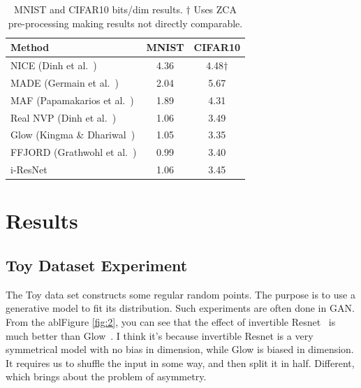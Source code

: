 \documentclass[final]{cvpr}
\begin{document}
\begin{table}[]
   \caption{MNIST and CIFAR10 bits/dim results. $†$ Uses ZCA pre-processing making results not directly comparable.}
   \label{table2}
   \begin{center}
      \begin{tabular}{@{}lcc@{}}
         \toprule
         Method                          & MNIST & CIFAR10 \\ \midrule
         NICE (Dinh et al.~\cite{dinh2014nice})        & 4.36  & 4.48$†$ \\
         MADE (Germain et al.~\cite{germain2015made})     & 2.04  & 5.67    \\
         MAF (Papamakarios et al.~\cite{papamakarios2017masked}) & 1.89  & 4.31    \\
         Real NVP (Dinh et al.~\cite{dinh2016density})    & 1.06  & 3.49    \\
         Glow (Kingma \& Dhariwal~\cite{kingma2018glow}) & 1.05  & 3.35    \\
         FFJORD (Grathwohl et al.~\cite{grathwohl2019scalable}) & 0.99  & 3.40    \\ \midrule
         i-ResNet~\cite{behrmann2019invertible} & 1.06  & 3.45    \\ \bottomrule
         \end{tabular}
   \end{center}
\end{table}


\section{Results}

\subsection{Toy Dataset Experiment}
The Toy data set constructs some regular random points. The purpose is to use a generative model to fit its distribution. Such experiments are often done in GAN. From the ablFigure \ref{fig:2}, you can see that the effect of invertible Resnet~\cite{behrmann2019invertible} is much better than Glow~\cite{kingma2018glow}. I think it’s because invertible Resnet is a very symmetrical model with no bias in dimension, while Glow is biased in dimension. It requires us to shuffle the input in some way, and then split it in half. Different, which brings about the problem of asymmetry.
\end{document}
